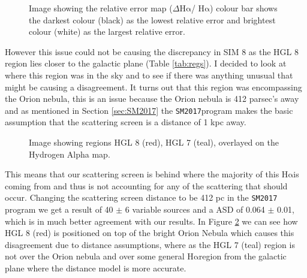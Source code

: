 \documentclass[a4paper, 10pt]{article}
\def\halpha{$\mathrm{H\alpha}$\;}
\def\sm{\texttt{SM2017}}
\begin{document}
\begin{figure}[H]
\begin{center}
  \caption{Image showing the relative error map ($\Delta$\halpha/ \halpha) colour bar shows the darkest colour (black) as the lowest relative error and brightest colour (white) as the largest relative error.}
  \label{fig:comp}
\end{center}
\end{figure}
However this issue could not be causing the discrepancy in SIM 8 as the HGL 8 region lies closer to the galactic plane (Table \ref{tab:regs}). I decided to look at where this region was in the sky and to see if there was anything unusual that might be causing a disagreement. It turns out that this region was encompassing the Orion nebula, this is an issue because the Orion nebula is 412 parsec's away and as mentioned in Section \ref{sec:SM2017} the \sm program makes the basic assumption that the scattering screen is a distance of 1 kpc away.
\begin{figure}
  \vspace{-20pt}
  \begin{center}
  \end{center}
  \vspace{-20pt}
  \caption{Image showing regions HGL 8 (red), HGL 7 (teal), overlayed on the Hydrogen Alpha map.}
  \label{fig:HAreg}
  \vspace{-10pt}
\end{figure}
This means that our scattering screen is behind where the majority of this \halpha is coming from and thus is not accounting for any of the scattering that should occur. Changing the scattering screen distance to be 412 pc in the \texttt{SM2017} program we get a result of 40 $\pm$ 6 variable sources and a ASD of 0.064 $\pm$ 0.01, which is in much better agreement with our results. In Figure \ref{fig:HAreg} we can see how HGL 8 (red) is positioned on top of the bright Orion Nebula which causes this disagreement due to distance assumptions, where as the HGL 7 (teal) region is not over the Orion nebula and over some general \halpha region from the galactic plane where the distance model is more accurate.
\end{document}
